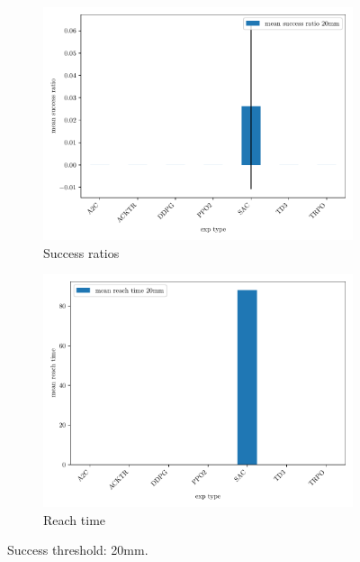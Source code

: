 \documentclass{article}
\begin{document}
\begin{figure}[H]
\centering
\begin{subfigure}{0.49\textwidth}
  \centering
  \includegraphics[width=\textwidth]{../success_20mm.pdf}
  \caption{Success ratios} 
\end{subfigure}
\begin{subfigure}{0.49\textwidth}
  \centering
  \includegraphics[width=\textwidth]{../reachtime_20mm.pdf} 
  \caption{Reach time}
\end{subfigure}
\caption{Success threshold: 20mm.}
\end{figure}
\end{document}

